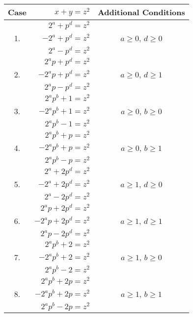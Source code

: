 \documentclass[11pt]{article}
\theoremstyle{definition}
\begin{document}
\begin{center}
\begin{tabular}{| c | r | c |} \hline
Case	 	& $x + y = z^2$ 			&  Additional Conditions \\ \hline \hline
		& $2^a + p^d = z^2$			& \\
1.		& $- 2^a + p^d = z^2$ 		&  $a \geq 0$, $d \geq 0$ \\ 
		& $2^a - p^d = z^2$			& \\ \hline
		& $2^ap + p^d = z^2$		& \\
2.		& $- 2^ap + p^d = z^2$	 	&  $a \geq 0$, $d \geq 1$ \\
		& $2^ap - p^d = z^2$			& \\ \hline
		& $2^ap^b + 1 = z^2$		& \\
3.		& $-2^ap^b + 1 = z^2$ 		&  $a \geq 0$, $b \geq 0$ \\
		& $2^ap^b - 1 = z^2$			& \\ \hline
		& $2^ap^b + p = z^2$		& \\
4.		& $-2^ap^b + p = z^2$ 		&  $a \geq 0$, $b \geq 1$ \\
		& $2^ap^b - p = z^2$			& \\ \hline
		& $2^a + 2p^d = z^2$		& \\
5.		& $-2^a + 2p^d = z^2$	 	&  $a \geq 1$, $d \geq 0$ \\ 
		& $2^a - 2p^d = z^2$			& \\ \hline
		& $2^ap + 2p^d = z^2$		& \\
6.		& $-2^ap + 2p^d = z^2$ 		&  $a \geq 1$, $d \geq 1$ \\
		& $2^ap - 2p^d = z^2$		& \\ \hline
		& $2^ap^b + 2 = z^2$		& \\
7.		& $-2^ap^b + 2 = z^2$ 		&  $a \geq 1$, $b \geq 0$ \\ 
		& $2^ap^b - 2 = z^2$			& \\ \hline
		& $2^ap^b + 2p = z^2$		& \\ 
8.		& $-2^ap^b + 2p = z^2$ 		&  $a \geq 1$, $b \geq 1$ \\ 
		& $2^ap^b - 2p = z^2$		& \\ \hline
\end{tabular}
\end{center}
\end{document}
